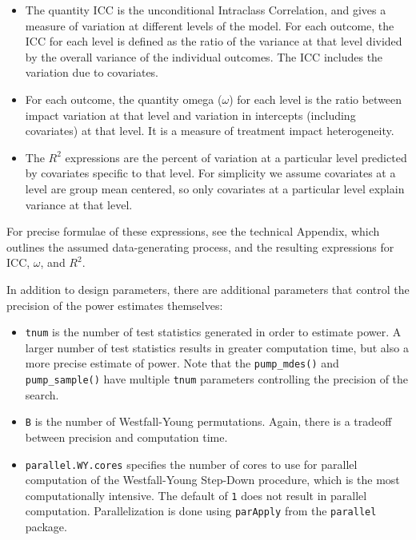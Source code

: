 \documentclass[
]{article}
\providecommand{\tightlist}{%
  \setlength{\itemsep}{0pt}\setlength{\parskip}{0pt}}
\begin{document}
\begin{itemize}
\item
  The quantity \(\text{ICC}\) is the unconditional Intraclass
  Correlation, and gives a measure of variation at different levels of
  the model. For each outcome, the ICC for each level is defined as the
  ratio of the variance at that level divided by the overall variance of
  the individual outcomes. The ICC includes the variation due to
  covariates.
\item
  For each outcome, the quantity omega (\(\omega\)) for each level is
  the ratio between impact variation at that level and variation in
  intercepts (including covariates) at that level. It is a measure of
  treatment impact heterogeneity.
\item
  The \(R^2\) expressions are the percent of variation at a particular
  level predicted by covariates specific to that level. For simplicity
  we assume covariates at a level are group mean centered, so only
  covariates at a particular level explain variance at that level.
\end{itemize}

For precise formulae of these expressions, see the technical Appendix,
which outlines the assumed data-generating process, and the resulting
expressions for \(\text{ICC}\), \(\omega\), and \(R^2\).

In addition to design parameters, there are additional parameters that
control the precision of the power estimates themselves:

\begin{itemize}
\tightlist
\item
  \texttt{tnum} is the number of test statistics generated in order to
  estimate power. A larger number of test statistics results in greater
  computation time, but also a more precise estimate of power. Note that
  the \texttt{pump\_mdes()} and \texttt{pump\_sample()} have multiple
  \texttt{tnum} parameters controlling the precision of the search.
\item
  \texttt{B} is the number of Westfall-Young permutations. Again, there
  is a tradeoff between precision and computation time.
\item
  \texttt{parallel.WY.cores} specifies the number of cores to use for
  parallel computation of the Westfall-Young Step-Down procedure, which
  is the most computationally intensive. The default of \texttt{1} does
  not result in parallel computation. Parallelization is done using
  \texttt{parApply} from the \texttt{parallel} package.
\end{itemize}
\end{document}
